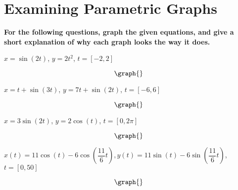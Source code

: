\documentclass{ximera}
\begin{document}
\section{Examining Parametric Graphs}
\textbf{For the following questions, graph the given equations, and give a short explanation of why each graph looks the way it does.}
\begin{question}
$x = \sin(2t)$, $y = 2t^2$, $t = [-2,2]$

\[
\graph{}
\]

\begin{freeResponse}
\end{freeResponse}
$x = t + \sin(3t)$, $y = 7t + \sin(2t)$, $t = [-6,6]$

\[
\graph{}
\]

\begin{freeResponse}
\end{freeResponse}
$x = 3\sin(2t)$, $y = 2\cos(t)$, $t = [0,2\pi]$

\[
\graph{}
\]

\begin{freeResponse}
\end{freeResponse}
$x(t) = 11\cos(t) - 6\cos(\dfrac{11}{6}t), y(t) = 11\sin(t) - 6\sin(\dfrac{11}{6} t)$, $t = [0,50]$

\[
\graph{}
\]

\begin{freeResponse}
\end{freeResponse}
\end{question}
\end{document}
